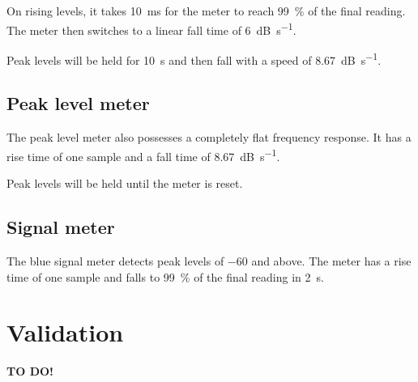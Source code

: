 On rising levels, it takes \SI{10}{\milli\second} for the meter to
reach \SI{99}{\percent} of the final reading.  The meter then switches
to a linear fall time of \SI{6}{\dB\per\second}.

Peak levels will be held for \SI{10}{\second} and then fall with a
speed of \SI{8.67}{\dB\per\second}.

\section{Peak level meter}

The peak level meter also possesses a completely flat frequency
response.  It has a rise time of one sample and a fall time of
\SI{8.67}{\dB\per\second}.

Peak levels will be held until the meter is reset.

\section{Signal meter}

The blue signal meter detects peak levels of \SI{-60}{\dBFS} and
above.  The meter has a rise time of one sample and falls to
\SI{99}{\percent} of the final reading in \SI{2}{\second}.

\chapter{Validation}
\label{chap:validation}

\textbf{TO DO!}




